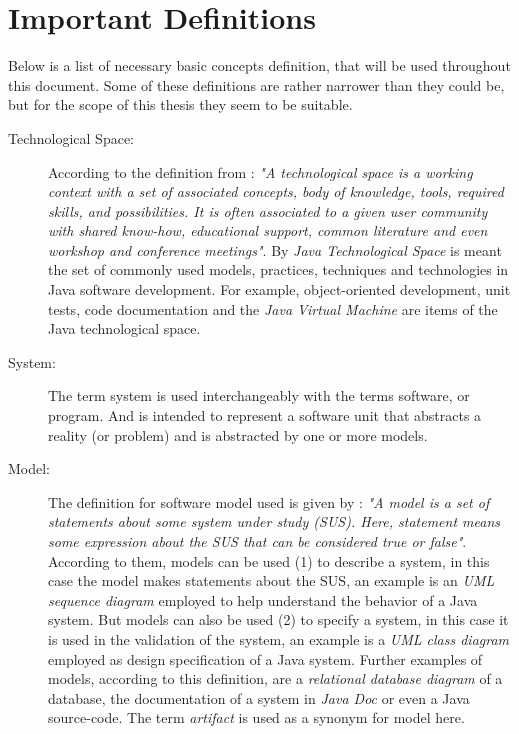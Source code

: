 \documentclass[tuberlin,cic,tc,english,noabntcite]{iiufrgs}
\begin{document}
\section{Important Definitions}
\label{sec:definitions}
Below is a list of necessary basic concepts definition, that will be used throughout this document. Some of these definitions are rather narrower than they could be, but for the scope of this thesis they seem to be suitable.

\begin{description}
	\item[Technological Space:] According to the definition from \citet[p. 1]{kurtev2002technological}: \emph{"A technological space is a working context with a set of associated concepts, body of knowledge, tools, required skills, and possibilities. It is often associated to a given user community with shared know-how, educational support, common literature and even workshop and conference meetings"}. By \emph{Java Technological Space} is meant the set of commonly used models, practices, techniques and technologies in Java software development. For example, object-oriented development, unit tests, code documentation and the \emph{Java Virtual Machine} are items of the Java technological space.

	\item[System:] The term system is used interchangeably with the terms software, or program. And is intended to represent a software unit that abstracts a reality (or problem) and is abstracted by one or more models.

	\item[Model:] The definition for software model used is given by \citet[p. 27]{seidewitz2003models}: \emph{"A model is a set of statements about some system under study (SUS). Here, statement means some expression about the SUS that can be considered true or false"}. According to them, models can be used (1) to describe a system, in this case the model makes statements about the SUS, an example is an \emph{UML sequence diagram} employed to help understand the behavior of a Java system. But models can also be used (2) to specify a system, in this case it is used in the validation of the system, an example is a \emph{UML class diagram} employed as design specification of a Java system. Further examples of models, according to this definition, are a \emph{relational database diagram} of a database, the documentation of a system in \emph{Java Doc} or even a Java source-code. The term \emph{artifact} is used as a synonym for model here.


\end{description}
\end{document}
